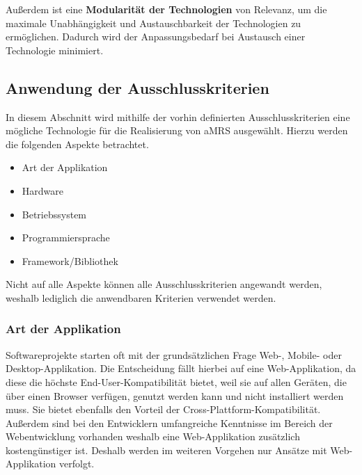Außerdem ist eine \textbf{Modularität der Technologien} von Relevanz, um die maximale Unabhängigkeit und Austauschbarkeit der Technologien zu ermöglichen. 
Dadurch wird der Anpassungsbedarf bei Austausch einer Technologie minimiert.

\subsection{Anwendung der Ausschlusskriterien}
In diesem Abschnitt wird mithilfe der vorhin definierten Ausschlusskriterien eine mögliche Technologie für die Realisierung von \ac{aMRS} ausgewählt. Hierzu werden die folgenden Aspekte betrachtet.
\begin{itemize}
  \item Art der Applikation
  \item Hardware
  \item Betriebssystem
  \item Programmiersprache
  \item Framework/Bibliothek
\end{itemize}\noindent
Nicht auf alle Aspekte können alle Ausschlusskriterien angewandt werden, weshalb lediglich die anwendbaren Kriterien verwendet werden.
\subsubsection*{Art der Applikation}
Softwareprojekte starten oft mit der grundsätzlichen Frage Web-, Mobile- oder Desktop-Applikation. Die Entscheidung fällt hierbei auf eine Web-Applikation, da diese die höchste End-User-Kompatibilität bietet, weil sie auf allen Geräten, die über einen Browser verfügen, genutzt werden kann und nicht installiert werden muss.
Sie bietet ebenfalls den Vorteil der Cross-Plattform-Kompatibilität.
Außerdem sind bei den Entwicklern umfangreiche Kenntnisse im Bereich der Webentwicklung vorhanden weshalb eine Web-Applikation zusätzlich kostengünstiger ist. 
Deshalb werden im weiteren Vorgehen nur Ansätze mit Web-Applikation verfolgt.
